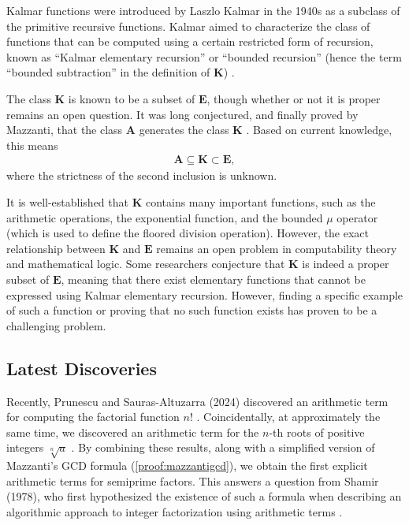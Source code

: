 \documentclass[11pt,reqno]{article}
\theoremstyle{plain}
\theoremstyle{definition}
\begin{document}
Kalmar functions were introduced by Laszlo Kalmar in the 1940s as a subclass of the primitive recursive functions. Kalmar aimed to characterize the class of functions that can be computed using a certain restricted form of recursion, known as ``Kalmar elementary recursion'' or ``bounded recursion'' (hence the term ``bounded subtraction'' in the definition of $\textbf{K}$) \cite{herman1969elementary}.

The class $\textbf{K}$ is known to be a subset of $\textbf{E}$, though whether or not it is proper remains an open question. It was long conjectured, and finally proved by Mazzanti, that the class $\textbf{A}$ generates the class $\textbf{K}$ \cite{mazzanti2002plainbases, marchenkov2007superposition}. Based on current knowledge, this means
\begin{align*}
    \textbf{A} \subseteq \textbf{K} \subset \textbf{E} ,
\end{align*}
where the strictness of the second inclusion is unknown.

It is well-established that $\textbf{K}$ contains many important functions, such as the arithmetic operations, the exponential function, and the bounded $\mu$ operator (which is used to define the floored division operation). However, the exact relationship between $\textbf{K}$ and $\textbf{E}$ remains an open problem in computability theory and mathematical logic. Some researchers conjecture that $\textbf{K}$ is indeed a proper subset of $\textbf{E}$, meaning that there exist elementary functions that cannot be expressed using Kalmar elementary recursion. However, finding a specific example of such a function or proving that no such function exists has proven to be a challenging problem.

\subsection{Latest Discoveries}

Recently, Prunescu and Sauras-Altuzarra (2024) discovered an arithmetic term for computing the factorial function $n!$ \cite{prunescu2024factorial}. Coincidentally, at approximately the same time, we discovered an arithmetic term for the $n$-th roots of positive integers $\sqrt[n]{a}$ \cite{shunia2024polynomial}. By combining these results, along with a simplified version of Mazzanti's GCD formula (\cref{proof:mazzantigcd}), we obtain the first explicit arithmetic terms for semiprime factors. This answers a question from Shamir (1978), who first hypothesized the existence of such a formula when describing an algorithmic approach to integer factorization using arithmetic terms \cite{shamir1978factoring}.
\end{document}
